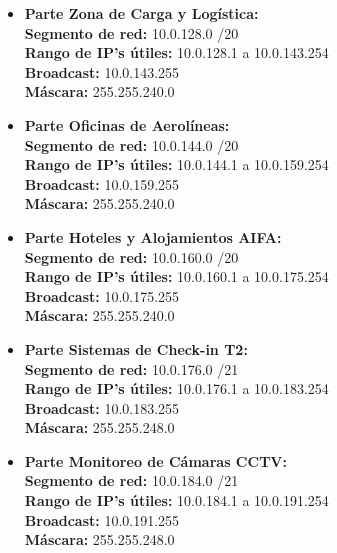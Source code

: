 \begin{itemize}[leftmargin=*]
    \item \textbf{Parte Zona de Carga y Logística:} \\
    \textbf{Segmento de red:} 10.0.128.0 /20 \\
    \textbf{Rango de IP's útiles:} 10.0.128.1 a 10.0.143.254 \\
    \textbf{Broadcast:} 10.0.143.255 \\
    \textbf{Máscara:} 255.255.240.0 
    \vspace{5pt}

    \item \textbf{Parte Oficinas de Aerolíneas:} \\
    \textbf{Segmento de red:} 10.0.144.0 /20 \\
    \textbf{Rango de IP's útiles:} 10.0.144.1 a 10.0.159.254 \\
    \textbf{Broadcast:} 10.0.159.255 \\
    \textbf{Máscara:} 255.255.240.0 
    \vspace{5pt}

    \item \textbf{Parte Hoteles y Alojamientos AIFA:} \\
    \textbf{Segmento de red:} 10.0.160.0 /20 \\
    \textbf{Rango de IP's útiles:} 10.0.160.1 a 10.0.175.254 \\
    \textbf{Broadcast:} 10.0.175.255 \\
    \textbf{Máscara:} 255.255.240.0 
    \vspace{5pt}

    \item \textbf{Parte Sistemas de Check-in T2:} \\
    \textbf{Segmento de red:} 10.0.176.0 /21 \\
    \textbf{Rango de IP's útiles:} 10.0.176.1 a 10.0.183.254 \\
    \textbf{Broadcast:} 10.0.183.255 \\
    \textbf{Máscara:} 255.255.248.0 
    \vspace{5pt}

    \item \textbf{Parte Monitoreo de Cámaras CCTV:} \\
    \textbf{Segmento de red:} 10.0.184.0 /21 \\
    \textbf{Rango de IP's útiles:} 10.0.184.1 a 10.0.191.254 \\
    \textbf{Broadcast:} 10.0.191.255 \\
    \textbf{Máscara:} 255.255.248.0 
    \vspace{5pt}


\end{itemize}
